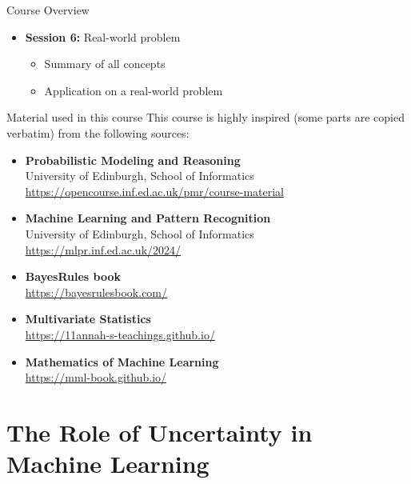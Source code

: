 \documentclass{beamer}
\begin{document}
\begin{frame}{Course Overview}
{\begin{itemize}
\begin{itemize}
      \end{itemize}
    \item \textbf{Session 6:} Real-world problem
      \begin{itemize}
      \item Summary of all concepts
      \item Application on a real-world problem
      \end{itemize}
  \end{itemize}
}
\end{frame}

\begin{frame}{Material used in this course}
  This course is highly inspired (some parts are copied verbatim) from the following sources:
  \begin{itemize}
  \item \textbf{Probabilistic Modeling and Reasoning}\\
    University of Edinburgh, School of Informatics
    \url{https://opencourse.inf.ed.ac.uk/pmr/course-material}
  \item \textbf{Machine Learning and Pattern Recognition}\\
    University of Edinburgh, School of Informatics
    \url{https://mlpr.inf.ed.ac.uk/2024/}\\
    \item \textbf{BayesRules book}\\
      \url{https://bayesrulesbook.com/}
  \item \textbf{Multivariate Statistics}\\
    \url{https://11annah-s-teachings.github.io/}
    \item \textbf{Mathematics of Machine Learning}\\
      \url{https://mml-book.github.io/}
  \end{itemize}
\end{frame}


\section{The Role of Uncertainty in Machine Learning}
\end{document}
